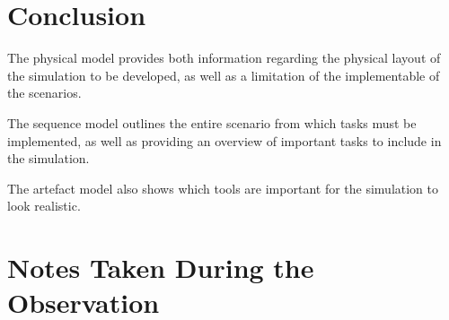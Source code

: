 \documentclass[paper=a4, fontsize=11pt]{scrartcl} %
\numberwithin{equation}{section} %
\numberwithin{figure}{section} %
\numberwithin{table}{section} %
\begin{document}
\section{Conclusion}
The physical model provides both information regarding the physical layout of the simulation to be developed, as well as a limitation of the implementable of the scenarios. 

The sequence model outlines the entire scenario from which tasks must be implemented, as well as providing an overview of important tasks to include in the simulation.

The artefact model also shows which tools are important for the simulation to look realistic.

\newpage

\appendix %
\section{Notes Taken During the Observation}
\end{document}
